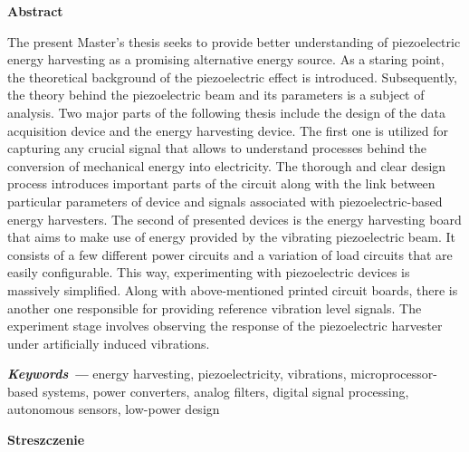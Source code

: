 \documentclass[12pt,a4paper]{article}
\providecommand{\keywords}[1]
{
  \small	
  \textbf{\textit{Keywords ---}} #1
}
\begin{document}
\newpage\null\thispagestyle{empty}\newpage

\textbf{Abstract}
\vspace{10pt}

The present Master's thesis seeks to provide better understanding of piezoelectric energy harvesting as a promising alternative energy source. As a staring point, the theoretical background of the piezoelectric effect is introduced. Subsequently, the theory behind the piezoelectric beam and its parameters is a subject of analysis. Two major parts of the following thesis include the design of the data acquisition device and the energy harvesting device. The first one is utilized for capturing any crucial signal that allows to understand processes behind the conversion of mechanical energy into electricity. The thorough and clear design process introduces important parts of the circuit along with the link between particular parameters of device and signals associated with piezoelectric-based energy harvesters. The second of presented devices is the energy harvesting board that aims to make use of energy provided by the vibrating piezoelectric beam. It consists of a few different power circuits and a variation of load circuits that are easily configurable. This way, experimenting with piezoelectric devices is massively simplified. Along with above-mentioned printed circuit boards, there is another one responsible for providing reference vibration level signals. The experiment stage involves observing the response of the piezoelectric harvester under artificially induced vibrations.

\par

\hspace{10pt}

\keywords{energy harvesting, piezoelectricity, vibrations, microprocessor-based systems, power converters, analog filters, digital signal processing, autonomous sensors, low-power design}

\vspace{10pt}
\textbf{Streszczenie}
\vspace{10pt}
\end{document}
